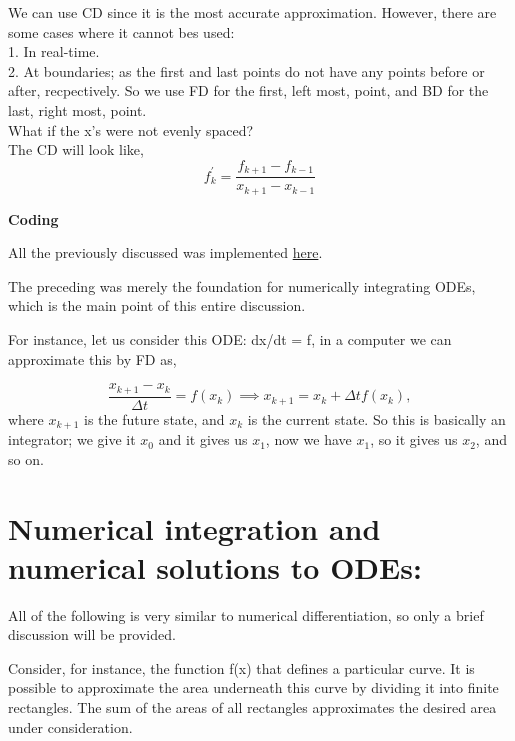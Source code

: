 \documentclass[11pt]{article}
\theoremstyle{definition}
\begin{document}
We can use CD since it is the most accurate approximation. However, there are some cases where it cannot bes used:\\
1. In real-time.\\
2. At boundaries; as the first and last points do not have any points before or after, recpectively. So we use FD for the first, left most, point, and BD for the last, right most, point.\\

What if the x's were not evenly spaced? \\
The CD will look like,
\begin{equation}
 f_k^\prime = \frac{f_{k+1} - f_{k-1}}{x_{k+1} - x_{k-1}}
\end{equation}

\begin{shaded}
\textbf{Coding} 

All the previously discussed was implemented \href{https://github.com/Phatimah/SSI2022/blob/main/week3/Implementations/Numerical\%20differentiation\%20on\%20data.ipynb}{here}.
\end{shaded}

The preceding was merely the foundation for numerically integrating ODEs, which is the main point of this entire discussion.

For instance, let us consider this ODE: dx/dt = f, in a computer we can approximate this by FD as, 

\begin{equation}
    \frac{x_{k+1}-x_{k}}{\Delta t} = f(x_k) \implies x_{k+1} = x_k + \Delta t f(x_k),
\end{equation}
where $x_{k+1}$ is the future state, and $x_k$ is the current state. So this is basically an integrator; we give it $x_0$ and it gives us $x_1$, now we have $x_1$, so it gives us $x_2$, and so on.

\section{Numerical integration and numerical solutions to ODEs:}

All of the following is very similar to numerical differentiation, so only a brief discussion will be provided. 

Consider, for instance, the function f(x) that defines a particular curve. It is possible to approximate the area underneath this curve by dividing it into finite rectangles. The sum of the areas of all rectangles approximates the desired area under consideration.
\end{document}
